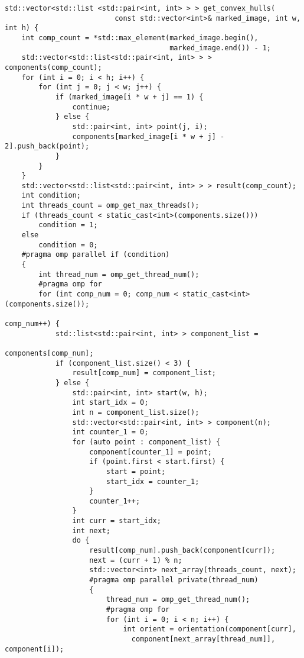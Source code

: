 \documentclass{report}
\begin{document}
\begin{lstlisting}
std::vector<std::list <std::pair<int, int> > > get_convex_hulls(
                          const std::vector<int>& marked_image, int w, int h) {
    int comp_count = *std::max_element(marked_image.begin(),
                                       marked_image.end()) - 1;
    std::vector<std::list<std::pair<int, int> > > components(comp_count);
    for (int i = 0; i < h; i++) {
        for (int j = 0; j < w; j++) {
            if (marked_image[i * w + j] == 1) {
                continue;
            } else {
                std::pair<int, int> point(j, i);
                components[marked_image[i * w + j] - 2].push_back(point);
            }
        }
    }
    std::vector<std::list<std::pair<int, int> > > result(comp_count);
    int condition;
    int threads_count = omp_get_max_threads();
    if (threads_count < static_cast<int>(components.size()))
        condition = 1;
    else
        condition = 0;
    #pragma omp parallel if (condition)
    {
        int thread_num = omp_get_thread_num();
        #pragma omp for
        for (int comp_num = 0; comp_num < static_cast<int>(components.size());
                                                                  comp_num++) {
            std::list<std::pair<int, int> > component_list =
                                                    components[comp_num];
            if (component_list.size() < 3) {
                result[comp_num] = component_list;
            } else {
                std::pair<int, int> start(w, h);
                int start_idx = 0;
                int n = component_list.size();
                std::vector<std::pair<int, int> > component(n);
                int counter_1 = 0;
                for (auto point : component_list) {
                    component[counter_1] = point;
                    if (point.first < start.first) {
                        start = point;
                        start_idx = counter_1;
                    }
                    counter_1++;
                }
                int curr = start_idx;
                int next;
                do {
                    result[comp_num].push_back(component[curr]);
                    next = (curr + 1) % n;
                    std::vector<int> next_array(threads_count, next);
                    #pragma omp parallel private(thread_num)
                    {
                        thread_num = omp_get_thread_num();
                        #pragma omp for
                        for (int i = 0; i < n; i++) {
                            int orient = orientation(component[curr],
                              component[next_array[thread_num]], component[i]);

\end{lstlisting}
\end{document}
